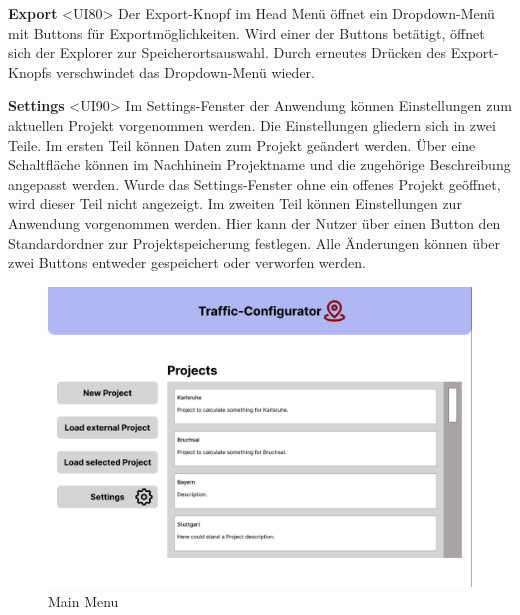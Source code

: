 \documentclass[parskip=full]{scrartcl} %
\begin{document}
\textbf{Export }<UI80>
Der Export-Knopf im Head Menü öffnet ein Dropdown-Menü mit Buttons für Exportmöglichkeiten. Wird einer der Buttons betätigt, öffnet sich der Explorer zur Speicherortsauswahl.
Durch erneutes Drücken des Export-Knopfs verschwindet das Dropdown-Menü wieder.

\newpage

\textbf{Settings }<UI90>
Im Settings-Fenster der Anwendung können Einstellungen zum aktuellen Projekt vorgenommen werden.
Die Einstellungen gliedern sich in zwei Teile.
Im ersten Teil können Daten zum Projekt geändert werden. Über eine Schaltfläche können im Nachhinein Projektname und die zugehörige Beschreibung angepasst werden. Wurde das Settings-Fenster ohne ein offenes Projekt geöffnet, wird dieser Teil nicht angezeigt.
Im zweiten Teil können Einstellungen zur Anwendung vorgenommen werden. Hier kann der Nutzer über einen Button den Standardordner zur Projektspeicherung festlegen.
Alle Änderungen können über zwei Buttons entweder gespeichert oder verworfen werden.

\newpage

\begin{figure}
    \centering
    \includegraphics[width=1\textwidth]{pictures/Main Menu.png}
    \caption{Main Menu}
\end{figure}
\end{document}
